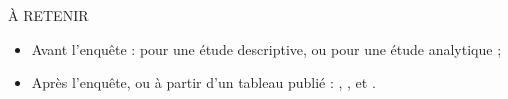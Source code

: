 \begin{mybox}[colbacktitle=NOTE]{\faInfoCircle{} À RETENIR}
\begin{itemize}[label=, font=\color{NOTE}]
	\item Avant l'enquête :  pour une étude descriptive,  ou  pour une étude analytique ;
	\item Après l'enquête, ou à partir d'un tableau publié : , ,  et .
\end{itemize}
\end{mybox}
